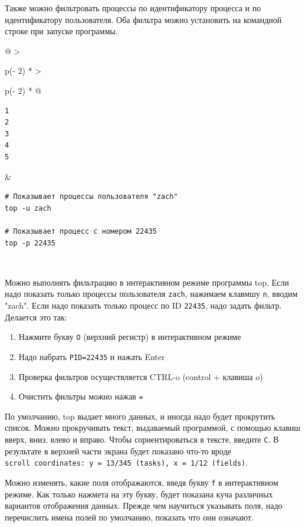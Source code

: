 \documentclass{report}
\begin{document}
Также можно фильтровать процессы по идентификатору процесса и по
идентификатору пользователя. Оба фильтра можно установить на командной
строке при запуске программы.

\begin{longtable}[]{@{}
  >{\raggedright\arraybackslash}p{(\columnwidth - 2\tabcolsep) * }
  >{\raggedright\arraybackslash}p{(\columnwidth - 2\tabcolsep) * }@{}}
\toprule
\endhead
\begin{minipage}[t]{\linewidth}\raggedright
\begin{verbatim}
1
2
3
4
5
\end{verbatim}
\end{minipage} & \begin{minipage}[t]{\linewidth}\raggedright
\begin{verbatim}
# Показывает процессы пользователя "zach"
top -u zach

# Показывает процесс с номером 22435
top -p 22435
\end{verbatim}
\end{minipage} \\ \addlinespace
\bottomrule
\end{longtable}

Можно выполнять фильтрацию в интерактивном режиме программы top. Если
надо показать только процессы пользователя \texttt{zach}, нажимаем
клавмшу \texttt{n}, вводим "zach". Если надо показать только процесс по
ID \texttt{22435}, надо задать фильтр. Делается это так:

\begin{enumerate}
\tightlist
\item
  Нажмите букву \texttt{O} (верхний регистр) в интерактивном режиме
\item
  Надо набрать \texttt{PID=22435} и нажать Enter
\item
  Проверка фильтров осуществляется CTRL-o (control + клавиша o)
\item
  Очистить фильтры можно нажав \texttt{=}
\end{enumerate}

По умолчанию, top выдает много данных, и иногда надо будет прокрутить
список. Можно прокручивать текст, выдаваемый программой, с помощью
клавиш вверх, вниз, влево и вправо. Чтобы сориентироваться в тексте,
введите \texttt{C}. В результате в верхней части экрана будет показано
что-то вроде
\texttt{scroll\ coordinates:\ y\ =\ 13/345\ (tasks),\ x\ =\ 1/12\ (fields)}.

Можно изменять, какие поля отображаются, введя букву \texttt{f} в
интерактивном режиме. Как только нажмета на эту букву, будет показана
куча различных вариантов отображения данных. Прежде чем научиться
указывать поля, надо перечислить имена полей по умолчанию, показать что
они означают.
\end{document}
